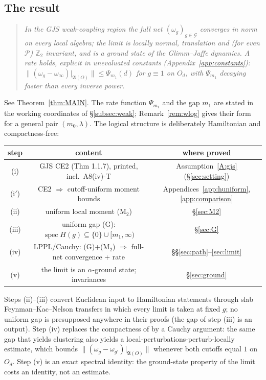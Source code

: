 \documentclass[11pt,a4paper]{article}
\theoremstyle{plain}
\theoremstyle{definition}
\theoremstyle{plain}
\theoremstyle{definition}
\newcommand{\Z}{\mathbb{Z}}
\newcommand{\A}{\mathfrak{A}}
\newcommand{\G}{\mathcal{G}}
\DeclareMathOperator{\spec}{spec}
\begin{document}
\subsection{The result}

\begin{quote}
\emph{In the GJS weak-coupling region the full net
$(\omega_g)_{g\in\G}$ converges in norm on
every local algebra; the limit is locally normal, translation and (for even $\mathscr P$)
$\Z_2$ invariant, and is a ground state of the Glimm--Jaffe dynamics. A rate holds,
explicit in unevaluated constants (Appendix~\ref{app:constants}):
$\|(\omega_g-\omega_\infty)|_{\A(O)}\|\le\Psi_{m_1}(d)$ for $g\equiv1$ on $O_d$, with
$\Psi_{m_1}$ decaying faster than every inverse power.}
\end{quote}

See Theorem~\ref{thm:MAIN}. The rate function $\Psi_{m_1}$ and the gap $m_1$ are stated in the
working coordinates of \S\ref{subsec:weak}; Remark~\ref{rem:wlog} gives their form for a
general pair $(m_0,\lambda)$. The logical structure is deliberately Hamiltonian and
compactness-free:

\begin{center}
\begin{tabular}{ccc}
\toprule
step & content & where proved\\
\midrule
(i) & GJS CE2 (Thm 1.1.7), printed, incl.\ A8(iv)-T
    & Assumption~\ref{A:gjs} (\S\ref{sec:setting})\\
(i$'$) & CE2 $\Rightarrow$ cutoff-uniform moment bounds
    & Appendices~\ref{app:huniform}, \ref{app:comparison}\\
(ii) & uniform local moment (M$_2$) & \S\ref{sec:M2}\\
(iii) & uniform gap (G): $\spec H(g)\subseteq\{0\}\cup[m_1,\infty)$ & \S\ref{sec:G}\\
(iv) & LPPL/Cauchy: (G)+(M$_2$) $\Rightarrow$ full-net convergence + rate & \S\S\ref{sec:path}--\ref{sec:limit}\\
(v) & the limit is an $\alpha$-ground state; invariances & \S\ref{sec:ground}\\
\bottomrule
\end{tabular}
\end{center}

Steps (ii)--(iii) convert Euclidean input to Hamiltonian statements through slab
Feynman--Kac--Nelson transfers in which every limit is taken at fixed $g$; no uniform gap is
presupposed anywhere in their proofs (the gap of step (iii) is an output). Step (iv) replaces
the compactness of \cite{GJ3} by a Cauchy argument: the same gap that yields clustering also
yields a local-perturbations-perturb-locally estimate, which bounds
$\|(\omega_g-\omega_{g'})|_{\A(O)}\|$ whenever both cutoffs equal $1$ on $O_d$. Step (v) is an
exact spectral identity: the ground-state property of the limit costs an identity, not an
estimate.
\end{document}
